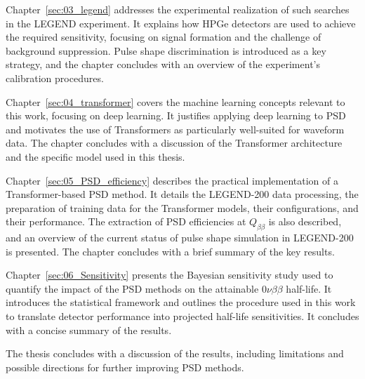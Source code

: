 Chapter~\ref{sec:03_legend} addresses the experimental realization of such searches in the LEGEND experiment. It explains how HPGe detectors are used to achieve the required sensitivity, focusing on signal formation and the challenge of background suppression. Pulse shape discrimination is introduced as a key strategy, and the chapter concludes with an overview of the experiment's calibration procedures. 

Chapter~\ref{sec:04_transformer} covers the machine learning concepts relevant to this work, focusing on deep learning. It justifies applying deep learning to PSD and motivates the use of Transformers as particularly well-suited for waveform data. The chapter concludes with a discussion of the Transformer architecture and the specific model used in this thesis. 

Chapter~\ref{sec:05_PSD_efficiency} describes the practical implementation of a Transformer-based PSD method. It details the LEGEND-200 data processing, the preparation of training data for the Transformer models, their configurations, and their performance. The extraction of PSD efficiencies at $Q_{\beta \beta}$ is also described, and an overview of the current status of pulse shape simulation in LEGEND-200 is presented. The chapter concludes with a brief summary of the key results. 

Chapter~\ref{sec:06_Sensitivity} presents the Bayesian sensitivity study used to quantify the impact of the PSD methods on the attainable $0 \nu \beta \beta$ half-life. It introduces the statistical framework and outlines the procedure used in this work to translate detector performance into projected half-life sensitivities. It concludes with a concise summary of the results. 


The thesis concludes with a discussion of the results, including limitations and possible directions for further improving PSD methods.